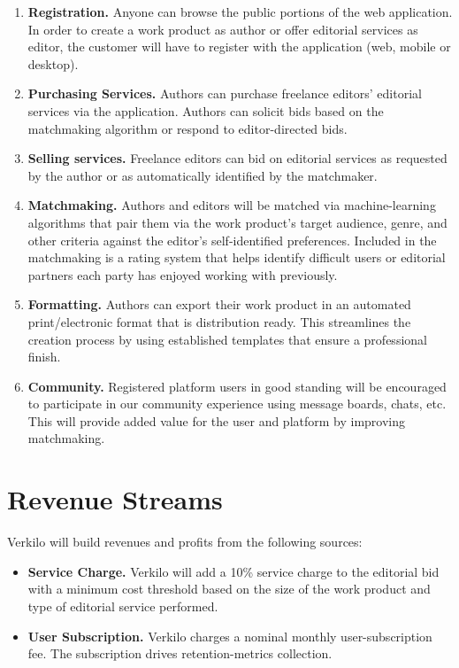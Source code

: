 \documentclass[11pt,openany]{book}
\providecommand{\tightlist}{%
  \setlength{\itemsep}{0pt}\setlength{\parskip}{0pt}}
\begin{document}
\begin{enumerate}
\def\labelenumi{\arabic{enumi}.}
\tightlist
\item
  \textbf{Registration.} Anyone can browse the public portions of the
  web application. In order to create a work product as author or offer
  editorial services as editor, the customer will have to register with
  the application (web, mobile or desktop).
\item
  \textbf{Purchasing Services.} Authors can purchase freelance editors'
  editorial services via the application. Authors can solicit bids based
  on the matchmaking algorithm or respond to editor-directed bids.
\item
  \textbf{Selling services.} Freelance editors can bid on editorial
  services as requested by the author or as automatically identified by
  the matchmaker.
\item
  \textbf{Matchmaking.} Authors and editors will be matched via
  machine-learning algorithms that pair them via the work product's
  target audience, genre, and other criteria against the editor's
  self-identified preferences. Included in the matchmaking is a rating
  system that helps identify difficult users or editorial partners each
  party has enjoyed working with previously.
\item
  \textbf{Formatting.} Authors can export their work product in an
  automated print/electronic format that is distribution ready. This
  streamlines the creation process by using established templates that
  ensure a professional finish.
\item
  \textbf{Community.} Registered platform users in good standing will be
  encouraged to participate in our community experience using message
  boards, chats, etc. This will provide added value for the user and
  platform by improving matchmaking.
\end{enumerate}

\hypertarget{revenue-streams}{%
\section{Revenue Streams}\label{revenue-streams}}

Verkilo will build revenues and profits from the following sources:

\begin{itemize}
\tightlist
\item
  \textbf{Service Charge.} Verkilo will add a 10\% service charge to the
  editorial bid with a minimum cost threshold based on the size of the
  work product and type of editorial service performed.
\item
  \textbf{User Subscription.} Verkilo charges a nominal monthly
  user-subscription fee. The subscription drives retention-metrics
  collection.
\end{itemize}
\end{document}
